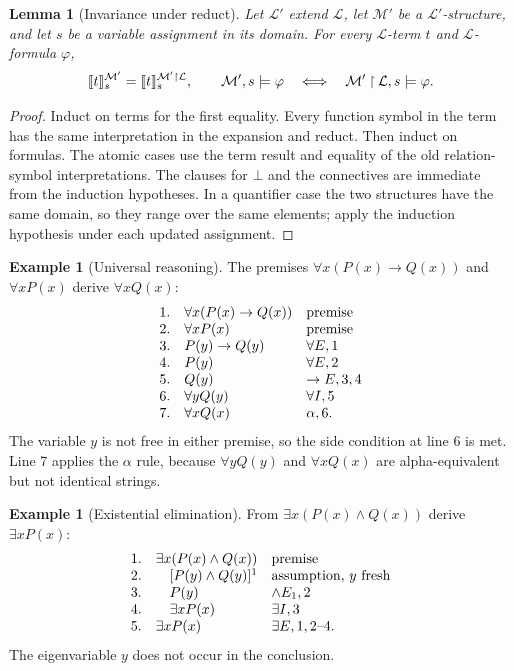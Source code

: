 \documentclass[11pt,oneside,openany]{book}
\theoremstyle{definition}
\newtheorem{example}[definition]{Example}
\theoremstyle{plain}
\newtheorem{lemma}[definition]{Lemma}
\theoremstyle{remark}
\DeclarePairedDelimiter{\sem}{\llbracket}{\rrbracket}
\newcommand{\Lang}{\mathcal{L}}
\newcommand{\Meta}{\mathcal{M}}
\newcommand{\restr}{\mathbin{\upharpoonright}}
\newcommand{\entails}{\models}
\newcommand{\bottom}{\bot}
\begin{document}
\begin{lemma}[Invariance under reduct]
\label{lem:reduct-invariance}
Let \(\Lang'\) extend \(\Lang\), let \(\Meta'\) be a
\(\Lang'\)-structure, and let \(s\) be a variable assignment in its domain.
For every \(\Lang\)-term \(t\) and \(\Lang\)-formula \(\varphi\),
\[
 \sem{t}^{\Meta'}_s=\sem{t}^{\Meta'\restr\Lang}_s,
 \qquad
 \Meta',s\entails\varphi
 \quad\Longleftrightarrow\quad
 \Meta'\restr\Lang,s\entails\varphi.
\]
\end{lemma}
\begin{proof}
Induct on terms for the first equality.  Every function symbol in the term has
the same interpretation in the expansion and reduct.  Then induct on formulas.
The atomic cases use the term result and equality of the old relation-symbol
interpretations.  The clauses for \(\bottom\) and the connectives are
immediate from the induction hypotheses.  In a quantifier case the two
structures have the same domain, so they range over the same elements; apply
the induction hypothesis under each updated assignment.
\end{proof}

\begin{example}[Universal reasoning]
The premises
\(\forall x(P(x)\to Q(x))\) and \(\forall xP(x)\) derive
\(\forall xQ(x)\):
\[
\begin{array}{rll}
1.&\forall x(P(x)\to Q(x))&\text{premise}\cr
2.&\forall xP(x)&\text{premise}\cr
3.&P(y)\to Q(y)&\forall E,1\cr
4.&P(y)&\forall E,2\cr
5.&Q(y)&\to E,3,4\cr
6.&\forall yQ(y)&\forall I,5\cr
7.&\forall xQ(x)&\alpha,6.
\end{array}
\]
The variable \(y\) is not free in either premise, so the side condition at
line 6 is met.  Line 7 applies the \(\alpha\) rule, because
\(\forall yQ(y)\) and \(\forall xQ(x)\) are alpha-equivalent but not
identical strings.
\end{example}

\begin{example}[Existential elimination]
From \(\exists x(P(x)\land Q(x))\) derive \(\exists xP(x)\):
\[
\begin{array}{rll}
1.&\exists x(P(x)\land Q(x))&\text{premise}\cr
2.&\quad[P(y)\land Q(y)]^1&\text{assumption, \(y\) fresh}\cr
3.&\quad P(y)&\land E_1,2\cr
4.&\quad\exists xP(x)&\exists I,3\cr
5.&\exists xP(x)&\exists E,1,2\text{--}4.
\end{array}
\]
The eigenvariable \(y\) does not occur in the conclusion.
\end{example}
\end{document}

